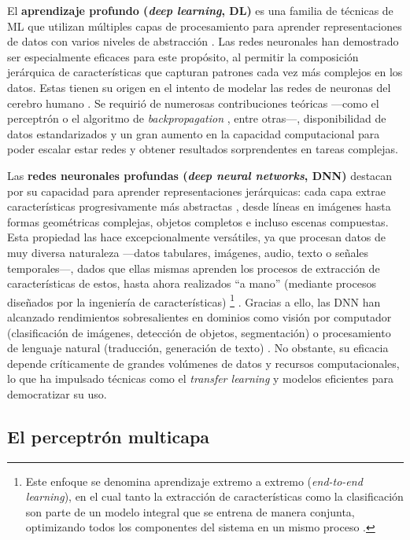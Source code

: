 El \textbf{aprendizaje profundo (\textit{deep learning}, \acrshort{DL})} es una familia de técnicas de \acrshort{ML} que utilizan múltiples capas de procesamiento para aprender representaciones de datos con varios niveles de abstracción \cite{lecun2015}. Las redes neuronales han demostrado ser especialmente eficaces para este propósito, al permitir la composición jerárquica de características que capturan patrones cada vez más complejos en los datos. Estas tienen su origen en el intento de modelar las redes de neuronas del cerebro humano \cite{mcculloch1943}. Se requirió de numerosas contribuciones teóricas ---como el perceptrón \cite{rosenblatt1958} o el algoritmo de \textit{backpropagation} \cite{rumelhart1986,werbos1994}, entre otras---, disponibilidad de datos estandarizados y un gran aumento en la capacidad computacional para poder escalar estar redes y obtener resultados sorprendentes en tareas complejas.

Las \textbf{redes neuronales profundas (\textit{deep neural networks}, \acrshort{DNN})} destacan por su capacidad para 
aprender representaciones jerárquicas: cada capa extrae características progresivamente más abstractas 
\cite{lecun2015}, desde líneas en imágenes hasta formas geométricas complejas, objetos completos e incluso 
escenas compuestas.
Esta propiedad las hace excepcionalmente versátiles, ya que procesan datos de muy diversa naturaleza ---datos 
tabulares, imágenes, audio, texto o señales temporales---, dados que ellas mismas aprenden los procesos de 
extracción de características de estos, hasta ahora realizados ``a mano'' (mediante procesos diseñados por la 
ingeniería de características)%
\footnote{
    Este enfoque se denomina aprendizaje extremo a extremo (\textit{end-to-end learning}), en el cual tanto la 
    extracción de características como la clasificación son parte de un modelo integral que se entrena de 
    manera conjunta, optimizando todos los componentes del sistema en un mismo proceso \cite{rusell2021}.
}
\cite{rusell2021}. 
Gracias a ello, las \acrshort{DNN} han alcanzado rendimientos sobresalientes en dominios como visión por computador 
(clasificación de imágenes, detección de objetos, segmentación) o procesamiento de lenguaje natural 
(traducción, generación de texto) \cite{redhat2024DeepLearningDefinition}.
No obstante, su eficacia depende críticamente de grandes volúmenes de datos y recursos computacionales, lo que 
ha impulsado técnicas como el \textit{transfer learning} y modelos eficientes para democratizar su uso.


\subsection{El perceptrón multicapa}

